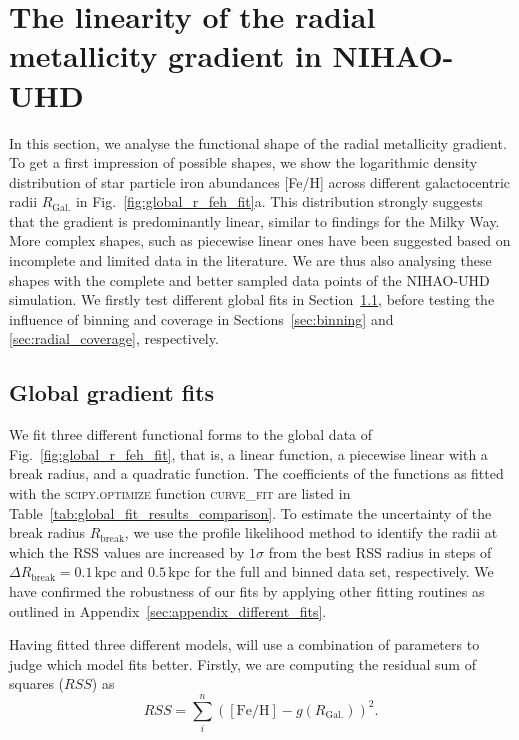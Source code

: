 \documentclass[fleqn,usenatbib]{mnras}
\begin{document}
\section{The linearity of the radial metallicity gradient in NIHAO-UHD}
\label{sec:linear_radial_metallicity_gradients}

In this section, we analyse the functional shape of the radial metallicity gradient. To get a first impression of possible shapes, we show the logarithmic density distribution of star particle iron abundances [Fe/H] across different galactocentric radii $R_\mathrm{Gal.}$ in Fig.~\ref{fig:global_r_feh_fit}a. This distribution strongly suggests that the gradient is predominantly linear, similar to findings for the Milky Way. More complex shapes, such as piecewise linear ones have been suggested based on incomplete and limited data in the literature. We are thus also analysing these shapes with the complete and better sampled data points of the NIHAO-UHD simulation. We firstly test different global fits in Section~\ref{sec:global_fits}, before testing the influence of binning and coverage in Sections~\ref{sec:binning} and \ref{sec:radial_coverage}, respectively.

\subsection{Global gradient fits}
\label{sec:global_fits}

We fit three different functional forms to the global data of Fig.~\ref{fig:global_r_feh_fit}, that is, a linear function, a piecewise linear with a break radius, and a quadratic function. The coefficients of the functions as fitted with the \textsc{scipy.optimize} function \textsc{curve\_fit} \citep{Scipy} are listed in Table~\ref{tab:global_fit_results_comparison}. To estimate the uncertainty of the break radius $R_\mathrm{break}$, we use the profile likelihood method to identify the radii at which the RSS values are increased by $1\sigma$ from the best RSS radius in steps of $\Delta R_\mathrm{break} = 0.1\,\mathrm{kpc}$ and $0.5\,\mathrm{kpc}$ for the full and binned data set, respectively. We have confirmed the robustness of our fits by applying other fitting routines as outlined in Appendix~\ref{sec:appendix_different_fits}.

Having fitted three different models, will use a combination of parameters to judge which model fits better. Firstly, we are computing the residual sum of squares ($RSS$) as 
\begin{equation} \label{eq:rss}
    RSS = \sum_i^n \left( \mathrm{[Fe/H]} - g(R_\mathrm{Gal.}) \right)^2.
\end{equation}
\end{document}

